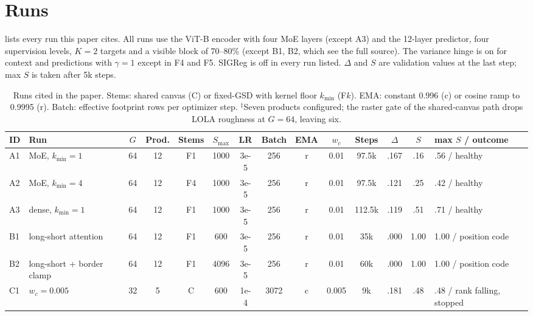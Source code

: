 \section{Runs}
\label{sec:supp_runs}

 lists every run this paper cites. All runs use the ViT-B encoder with four MoE layers (except A3) and the 12-layer predictor, four supervision levels, $K{=}2$ targets and a visible block of 70--80\% (except B1, B2, which see the full source). The variance hinge is on for context and predictions with $\gamma{=}1$ except in F4 and F5. SIGReg is off in every run listed. $\Delta$ and $S$ are validation values at the last step; max $S$ is taken after 5k steps.

\begin{table}[t]
  \centering
  \scriptsize
  \setlength{\tabcolsep}{3pt}
  \caption{Runs cited in the paper. Stems: shared canvas (C) or fixed-GSD with kernel floor $k_{\min}$ (F$k$). EMA: constant 0.996 (c) or cosine ramp to 0.9995 (r). Batch: effective footprint rows per optimizer step. $^\ddagger$Seven products configured; the raster gate of the shared-canvas path drops LOLA roughness at $G{=}64$, leaving six.}
  \label{tab:supp_runs}
  \begin{tabular}{@{}llcccccccccccl@{}}
    \toprule
    ID & Run & $G$ & Prod. & Stems & $S_{\max}$ & LR & Batch & EMA & $w_c$ & Steps & $\Delta$ & $S$ & max $S$ / outcome \\
    \midrule
    A1 & MoE, $k_{\min}{=}1$         & 64  & 12 & F1 & 1000 & 3e-5 & 256  & r & 0.01  & 97.5k & .167 & .16 & .56 / healthy \\
    A2 & MoE, $k_{\min}{=}4$                                 & 64  & 12 & F4 & 1000 & 3e-5 & 256  & r & 0.01  & 97.5k & .121 & .25 & .42 / healthy \\
    A3 & dense, $k_{\min}{=}1$                               & 64  & 12 & F1 & 1000 & 3e-5 & 256  & r & 0.01  & 112.5k & .119 & .51 & .71 / healthy \\
    B1 & long-short attention                           & 64  & 12 & F1 & 600  & 3e-5 & 256  & r & 0.01  & 35k   & .000 & 1.00 & 1.00 / position code \\
    B2 & long-short + border clamp                           & 64  & 12 & F1 & 4096 & 3e-5 & 256  & r & 0.01  & 60k   & .000 & 1.00 & 1.00 / position code \\
    C1 & $w_c{=}0.005$                           & 32  & 5  & C  & 600  & 1e-4 & 3072 & c & 0.005 & 9k    & .181 & .48 & .48 / rank falling, stopped \\

\end{tabular}
\end{table}
